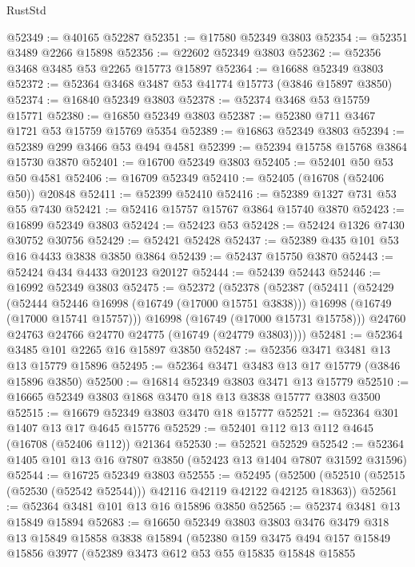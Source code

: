 \begin{lexlean}{RustStd}
\begin{coremodule}
@52349 := @40165 @52287
@52351 := @17580 @52349 @3803
@52354 := @52351 @3489 @2266 @15898
@52356 := @22602 @52349 @3803
@52362 := @52356 @3468 @3485 @53 @2265 @15773 @15897
@52364 := @16688 @52349 @3803
@52372 := @52364 @3468 @3487 @53 @41774 @15773 (@3846 @15897 @3850)
@52374 := @16840 @52349 @3803
@52378 := @52374 @3468 @53 @15759 @15771
@52380 := @16850 @52349 @3803
@52387 := @52380 @711 @3467 @1721 @53 @15759 @15769 @5354
@52389 := @16863 @52349 @3803
@52394 := @52389 @299 @3466 @53 @494 @4581
@52399 := @52394 @15758 @15768 @3864 @15730 @3870
@52401 := @16700 @52349 @3803
@52405 := @52401 @50 @53 @50 @4581
@52406 := @16709 @52349
@52410 := @52405 (@16708 (@52406 @50)) @20848
@52411 := @52399 @52410
@52416 := @52389 @1327 @731 @53 @55 @7430
@52421 := @52416 @15757 @15767 @3864 @15740 @3870
@52423 := @16899 @52349 @3803
@52424 := @52423 @53
@52428 := @52424 @1326 @7430 @30752 @30756
@52429 := @52421 @52428
@52437 := @52389 @435 @101 @53 @16 @4433 @3838 @3850 @3864
@52439 := @52437 @15750 @3870
@52443 := @52424 @434 @4433 @20123 @20127
@52444 := @52439 @52443
@52446 := @16992 @52349 @3803
@52475 := @52372
    (@52378
      (@52387
        (@52411
          (@52429
            (@52444 @52446 @16998 (@16749 (@17000 @15751 @3838)))
            @16998
            (@16749 (@17000 @15741 @15757)))
          @16998
          (@16749 (@17000 @15731 @15758)))
        @24760
        @24763
        @24766
        @24770
        @24775
        (@16749 (@24779 @3803))))
@52481 := @52364 @3485 @101 @2265 @16 @15897 @3850
@52487 := @52356 @3471 @3481 @13 @13 @15779 @15896
@52495 := @52364 @3471 @3483 @13 @17 @15779 (@3846 @15896 @3850)
@52500 := @16814 @52349 @3803 @3471 @13 @15779
@52510 := @16665 @52349 @3803 @1868 @3470 @18 @13 @3838 @15777 @3803 @3500
@52515 := @16679 @52349 @3803 @3470 @18 @15777
@52521 := @52364 @301 @1407 @13 @17 @4645 @15776
@52529 := @52401 @112 @13 @112 @4645 (@16708 (@52406 @112)) @21364
@52530 := @52521 @52529
@52542 := @52364 @1405 @101 @13 @16 @7807 @3850 (@52423 @13 @1404 @7807 @31592 @31596)
@52544 := @16725 @52349 @3803
@52555 := @52495
    (@52500 (@52510 (@52515 (@52530 (@52542 @52544))) @42116 @42119 @42122 @42125 @18363))
@52561 := @52364 @3481 @101 @13 @16 @15896 @3850
@52565 := @52374 @3481 @13 @15849 @15894
@52683 := @16650
    @52349
    @3803
    @3803
    @3476
    @3479
    @318
    @13
    @15849
    @15858
    @3838
    @15894
    (@52380
      @159
      @3475
      @494
      @157
      @15849
      @15856
      @3977
      (@52389
        @3473
        @612
        @53
        @55
        @15835
        @15848
        @15855

\end{coremodule}
\end{lexlean}
